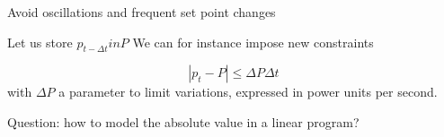 \begin{frame} {Avoid oscillations and frequent set point changes} 

    Let us store $p_{t-\Delta t} in P$ We can for instance impose new constraints 

    $$| p_t - P| \leq \Delta P \Delta t$$
    with $\Delta P$ a parameter to limit variations, expressed in power units per second.

    Question: how to model the absolute value in a linear program?
\end{frame}